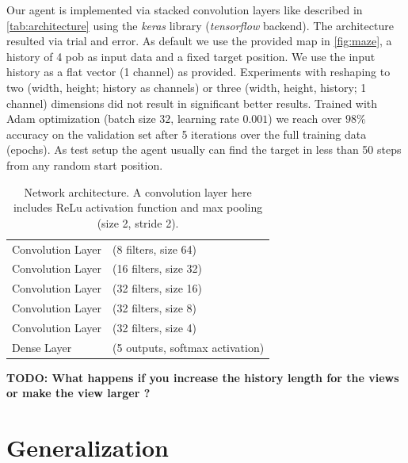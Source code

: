 \documentclass[a4paper,14pt]{article}
\begin{document}
Our agent is implemented via stacked convolution layers like described in
\autoref{tab:architecture} using the \emph{keras} library (\emph{tensorflow} backend).
The architecture resulted via trial and error.
As default we use the provided map in \autoref{fig:maze}, a history of 4 pob as input data
and a fixed target position.
We use the input history as a flat vector (1 channel) as provided.
Experiments with reshaping to two (width, height; history as channels) or three
(width, height, history; 1 channel) dimensions did not result in significant
better results.
Trained with Adam optimization (batch size $32$, learning rate $0.001$) we reach over $98\%$
accuracy on the validation set after 5 iterations over the full training data
(epochs).
As test setup the agent usually can find the target in less than 50 steps from
any random start position.

\begin{table}[h]
  \centering
  \begin{tabular}{ll}
    \hline
    Convolution Layer & (8 filters, size 64) \\
    Convolution Layer & (16 filters, size 32) \\
    Convolution Layer & (32 filters, size 16) \\
    Convolution Layer & (32 filters, size 8) \\
    Convolution Layer & (32 filters, size 4) \\
    Dense Layer & (5 outputs, softmax activation) \\
    \hline
  \end{tabular}
  \caption{Network architecture. A convolution layer here includes ReLu
    activation function and max pooling (size 2, stride 2).}
  \label{tab:architecture}
\end{table}

\textbf{TODO: What happens if you increase the history length for the views or make the
view larger ?}

\section{Generalization}\label{sec:generalization}
\end{document}
